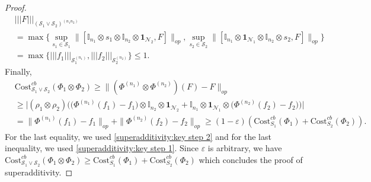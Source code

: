 \documentclass[11pt,reqno]{amsart}
\numberwithin{equation}{section}
\newcommand{\mb}{\mathbb}
\newcommand{\mc}{\mathcal}
\newcommand{\Cost}{\mathrm{Cost}}
\begin{document}
\begin{proof}
\begin{align*}
 &|||F|||_{(\mc S_1 \vee \mc S_2)^{(n_1n_2)}} \\
 & = \max\{\sup_{s_1\in \mc S_1} \|[\mb I_{n_1}\otimes s_1\otimes \mb I_{n_2} \otimes  \textbf{1}_{\mc N_2}, F]\|_{op}, \sup_{s_2\in \mc S_2} \|[\mb I_{n_1}\otimes \textbf{1}_{\mc N_1}\otimes \mb I_{n_2} \otimes s_2, F]\|_{op}\} \\
 & = \max\{|||f_1|||_{\mc S_1^{(n_1)}}, |||f_2|||_{\mc S_2^{(n_2)}} \}  \le 1. 
\end{align*}
Finally,  
\begin{align*}
& \Cost_{\mc S_1 \vee \mc S_2}^{cb}(\Phi_1 \otimes \Phi_2) \ge \|(\Phi^{(n_1)} \otimes \Phi^{(n_2)})(F) - F\|_{op} \\
& \ge \bigg| (\rho_1 \otimes \rho_2) \bigg( \big(  \Phi^{(n_1)}(f_1) - f_1 \big) \otimes  \mb I_{n_2}\otimes \textbf{1}_{\mc N_2} +  \mb I_{n_1}\otimes \textbf{1}_{\mc N_1} \otimes \big( \Phi^{(n_2)}(f_2) - f_2\big) \bigg) \bigg| \\
& = \|\Phi^{(n_1)}(f_1) - f_1 \|_{op} + \|\Phi^{(n_2)}(f_2) - f_2\|_{op} \ge (1-\varepsilon)(\Cost_{S_1}^{cb}(\Phi_1)+ \Cost^{cb}_{S_2}(\Phi_2)).
\end{align*}
For the last equality, we used \eqref{superadditivity:key step 2} and for the last inequality, we used \eqref{superadditivity:key step 1}. Since $\varepsilon$ is arbitrary, we have $\Cost_{\mc S_1 \vee \mc S_2}^{cb}(\Phi_1 \otimes \Phi_2)\ge \Cost_{S_1}^{cb}(\Phi_1)+ \Cost^{cb}_{S_2}(\Phi_2)$ which concludes the proof of superadditivity.
\end{proof}
\end{document}
